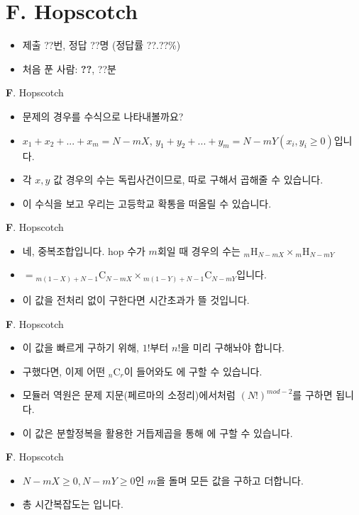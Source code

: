\section{F. Hopscotch}

\begin{frame} %
    \begin{itemize}
        \item 제출 ??번, 정답 ??명 (정답률 ??.??\%)
        \item 처음 푼 사람: \textbf{??}, ??분
    \end{itemize}
\end{frame}

\begin{frame}{\textbf{F}. Hopscotch}
    \begin{itemize}
        \item 문제의 경우를 수식으로 나타내볼까요?
        \item $x_{1}+x_{2}+...+x_{m}=N-mX$, $y_{1}+y_{2}+...+y_{m}=N-mY (x_{i}, y_{i} \geq 0)$입니다.
        \item 각 $x, y$ 값 경우의 수는 독립사건이므로, 따로 구해서 곱해줄 수 있습니다.
        \item 이 수식을 보고 우리는 고등학교 확통을 떠올릴 수 있습니다.
    \end{itemize}
\end{frame}

\begin{frame}{\textbf{F}. Hopscotch}
    \begin{itemize}
        \item 네, 중복조합입니다. hop 수가 $m$회일 때 경우의 수는 ${}_m \mathrm{H}_{N-mX} \times {}_m \mathrm{H}_{N-mY}$
        \item $= {}_{m(1-X)+N-1} \mathrm{C}_{N-mX} \times {}_{m(1-Y)+N-1} \mathrm{C}_{N-mY}$입니다.
        \item 이 값을 전처리 없이 구한다면 시간초과가 뜰 것입니다.
    \end{itemize}
\end{frame}

\begin{frame}{\textbf{F}. Hopscotch}
    \begin{itemize}
        \item 이 값을 빠르게 구하기 위해, $1!$부터 $n!$을 미리 구해놔야 합니다.
        \item 구했다면, 이제 어떤 ${}_{n} \mathrm{C}_{r}$이 들어와도  에 구할 수 있습니다.
        \item 모듈러 역원은 문제 지문(페르마의 소정리)에서처럼 $(N!)^{mod-2}$를 구하면 됩니다.
        \item 이 값은 분할정복을 활용한 거듭제곱을 통해  에 구할 수 있습니다.
    \end{itemize}
\end{frame}

\begin{frame}{\textbf{F}. Hopscotch}
    \begin{itemize}
        \item $N-mX \geq 0, N-mY \geq 0$인 $m$을 돌며 모든 값을 구하고 더합니다.
        \item 총 시간복잡도는 입니다.
    \end{itemize}
\end{frame}
